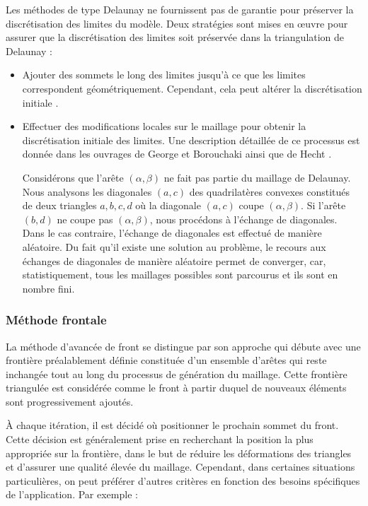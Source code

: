Les méthodes de type Delaunay ne fournissent pas de garantie pour préserver la discrétisation des limites du modèle. Deux stratégies sont mises en œuvre pour assurer que la discrétisation des limites soit préservée dans la triangulation de Delaunay \cite{botella2016generation}:\\

\begin{itemize}
    \item Ajouter des sommets le long des limites jusqu'à ce que les limites correspondent géométriquement. Cependant, cela peut altérer la discrétisation initiale \cite{cohen2002conforming}.\\
    \item Effectuer des modifications locales sur le maillage pour obtenir la discrétisation initiale des limites. Une description détaillée de ce processus est donnée dans les ouvrages de George et Borouchaki \cite{george1997triangulation} ainsi que de Hecht \cite{hecht2007maillage}. 
    
    Considérons que l'arête $(\alpha, \beta)$ ne fait pas partie du maillage de Delaunay. Nous analysons les diagonales $(a, c)$ des quadrilatères convexes constitués de deux triangles $a, b, c, d$ où la diagonale $(a, c)$ coupe $(\alpha, \beta)$. Si l'arête $(b, d)$ ne coupe pas $(\alpha, \beta)$, nous procédons à l'échange de diagonales. Dans le cas contraire, l'échange de diagonales est effectué de manière aléatoire. Du fait qu'il existe une solution au problème, le recours aux échanges de diagonales de manière aléatoire permet de converger, car, statistiquement, tous les maillages possibles sont parcourus et ils sont en nombre fini.
\end{itemize}


\subsubsection{Méthode frontale}

La méthode d'avancée de front \cite{george1994advancing, lohner1996progress, lohner2014recent} se distingue par son approche qui débute avec une frontière préalablement définie constituée d'un ensemble d'arêtes qui reste inchangée tout au long du processus de génération du maillage. Cette frontière triangulée est considérée comme le front à partir duquel de nouveaux éléments sont progressivement ajoutés.

À chaque itération, il est décidé où positionner le prochain sommet du front. Cette décision est généralement prise en recherchant la position la plus appropriée sur la frontière, dans le but de réduire les déformations des triangles et d'assurer une qualité élevée du maillage. Cependant, dans certaines situations particulières, on peut préférer d'autres critères en fonction des besoins spécifiques de l'application. Par exemple :\\

